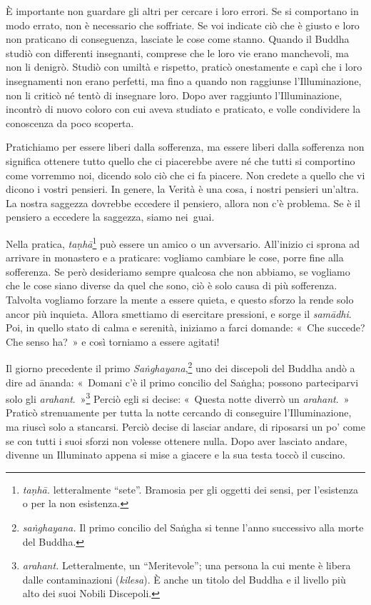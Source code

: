 È importante non guardare gli altri per cercare i loro errori. Se si
comportano in modo errato, non è necessario che soffriate. Se voi
indicate ciò che è giusto e loro non praticano di conseguenza, lasciate
le cose come stanno. Quando il Buddha studiò con differenti insegnanti,
comprese che le loro vie erano manchevoli, ma non li denigrò. Studiò con
umiltà e rispetto, praticò onestamente e capì che i loro insegnamenti
non erano perfetti, ma fino a quando non raggiunse l'Illuminazione, non
li criticò né tentò di insegnare loro. Dopo aver raggiunto
l'Illuminazione, incontrò di nuovo coloro con cui aveva studiato e
praticato, e volle condividere la conoscenza da poco scoperta.

Pratichiamo per essere liberi dalla sofferenza, ma essere liberi dalla
sofferenza non significa ottenere tutto quello che ci piacerebbe avere
né che tutti si comportino come vorremmo noi, dicendo solo ciò che ci fa
piacere. Non credete a quello che vi dicono i vostri pensieri. In
genere, la Verità è una cosa, i nostri pensieri un'altra. La nostra
saggezza dovrebbe eccedere il pensiero, allora non c'è problema. Se è il
pensiero a eccedere la saggezza, siamo nei~guai.

Nella pratica, \emph{taṇhā}\footnote{\emph{taṇhā.} letteralmente
  ``sete''. Bramosia per gli oggetti dei sensi, per l'esistenza o per la
  non esistenza.} può essere un amico o un avversario. All'inizio ci
sprona ad arrivare in monastero e a praticare: vogliamo cambiare le
cose, porre fine alla sofferenza. Se però desideriamo sempre qualcosa
che non abbiamo, se vogliamo che le cose siano diverse da quel che sono,
ciò è solo causa di più sofferenza. Talvolta vogliamo forzare la mente a
essere quieta, e questo sforzo la rende solo ancor più inquieta. Allora
smettiamo di esercitare pressioni, e sorge il \emph{samādhi}. Poi, in
quello stato di calma e serenità, iniziamo a farci domande: «~Che
succede? Che senso ha?~» e così torniamo a essere agitati!

Il giorno precedente il primo \emph{Saṅghayana},\footnote{\emph{saṅghayana.} Il
  primo concilio del Saṅgha si tenne l'anno successivo alla morte del
  Buddha.} uno dei discepoli del Buddha andò a dire ad ānanda: «~Domani
c'è il primo concilio del Saṅgha; possono parteciparvi solo gli
\emph{arahant}.~»\footnote{\emph{arahant.} Letteralmente, un
  ``Meritevole''; una persona la cui mente è libera dalle contaminazioni
  (\emph{kilesa}). È anche un titolo del Buddha e il livello più alto
  dei suoi Nobili Discepoli.} Perciò egli si decise: «~Questa notte
diverrò un \emph{arahant}.~» Praticò strenuamente per tutta la notte
cercando di conseguire l'Illuminazione, ma riuscì solo a stancarsi.
Perciò decise di lasciar andare, di riposarsi un po' come se con tutti i
suoi sforzi non volesse ottenere nulla. Dopo aver lasciato andare,
divenne un Illuminato appena si mise a giacere e la sua testa toccò il
cuscino.

